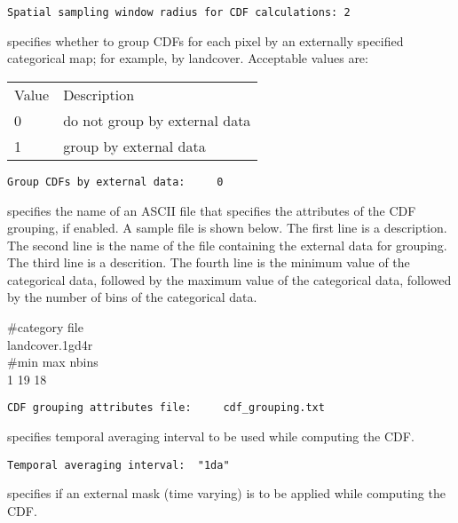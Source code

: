  \begin{Verbatim}[frame=single]
Spatial sampling window radius for CDF calculations: 2
 \end{Verbatim}

 
  specifies whether to group CDFs
 for each pixel by an externally specified categorical map; for example,
 by landcover.
 Acceptable values are:

 \begin{tabular}{ll}
 Value & Description                   \\
 0     & do not group by external data \\
 1     & group by external data        \\
 \end{tabular}
 

 \begin{Verbatim}[frame=single]
Group CDFs by external data:     0
 \end{Verbatim}

 
  specifies the name of an
 ASCII file that specifies the attributes of the CDF grouping,
 if enabled.  A sample file is shown below.
 The first line is a description.  The second line is
 the name of the file containing the external data for grouping.
 The third line is a descrition.  The fourth line is the minimum
 value of the categorical data, followed by the maximum value of the
 categorical data, followed by the number of bins of the categorical
 data.

 \#category file  \\
 landcover.1gd4r  \\
 \#min max nbins  \\
 1 19 18          \\
 

 \begin{Verbatim}[frame=single]
CDF grouping attributes file:     cdf_grouping.txt
 \end{Verbatim}

 
 specifies temporal averaging interval to be used while computing
 the CDF.
 

 \begin{Verbatim}[frame=single]
Temporal averaging interval:  "1da"
 \end{Verbatim}

 
 specifies if an external mask (time varying) is to be applied
 while computing the CDF.
 

